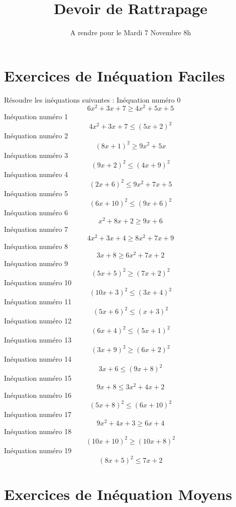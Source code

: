 \documentclass{article}
\title{Devoir de Rattrapage}
\date{A rendre pour le Mardi 7 Novembre 8h}\usepackage{natbib}
\begin{document}
\maketitle
 \section{Exercices de In\'equation Faciles}

 R\'esoudre les in\'equations suivantes : 
In\'equation num\'ero 0 \[6 x^{2} + 3 x + 7 \geq 4 x^{2} + 5 x + 5\]In\'equation num\'ero 1 \[4 x^{2} + 3 x + 7 \leq \left(5 x + 2\right)^{2}\]In\'equation num\'ero 2 \[\left(8 x + 1\right)^{2} \geq 9 x^{2} + 5 x\]In\'equation num\'ero 3 \[\left(9 x + 2\right)^{2} \leq \left(4 x + 9\right)^{2}\]In\'equation num\'ero 4 \[\left(2 x + 6\right)^{2} \leq 9 x^{2} + 7 x + 5\]In\'equation num\'ero 5 \[\left(6 x + 10\right)^{2} \leq \left(9 x + 6\right)^{2}\]In\'equation num\'ero 6 \[x^{2} + 8 x + 2 \geq 9 x + 6\]In\'equation num\'ero 7 \[4 x^{2} + 3 x + 4 \geq 8 x^{2} + 7 x + 9\]In\'equation num\'ero 8 \[3 x + 8 \geq 6 x^{2} + 7 x + 2\]In\'equation num\'ero 9 \[\left(5 x + 5\right)^{2} \geq \left(7 x + 2\right)^{2}\]In\'equation num\'ero 10 \[\left(10 x + 3\right)^{2} \leq \left(3 x + 4\right)^{2}\]In\'equation num\'ero 11 \[\left(5 x + 6\right)^{2} \leq \left(x + 3\right)^{2}\]In\'equation num\'ero 12 \[\left(6 x + 4\right)^{2} \leq \left(5 x + 1\right)^{2}\]In\'equation num\'ero 13 \[\left(3 x + 9\right)^{2} \geq \left(6 x + 2\right)^{2}\]In\'equation num\'ero 14 \[3 x + 6 \leq \left(9 x + 8\right)^{2}\]In\'equation num\'ero 15 \[9 x + 8 \leq 3 x^{2} + 4 x + 2\]In\'equation num\'ero 16 \[\left(5 x + 8\right)^{2} \leq \left(6 x + 10\right)^{2}\]In\'equation num\'ero 17 \[9 x^{2} + 4 x + 3 \geq 6 x + 4\]In\'equation num\'ero 18 \[\left(10 x + 10\right)^{2} \geq \left(10 x + 8\right)^{2}\]In\'equation num\'ero 19 \[\left(8 x + 5\right)^{2} \leq 7 x + 2\]
 \section{Exercices de In\'equation Moyens}
\end{document}
